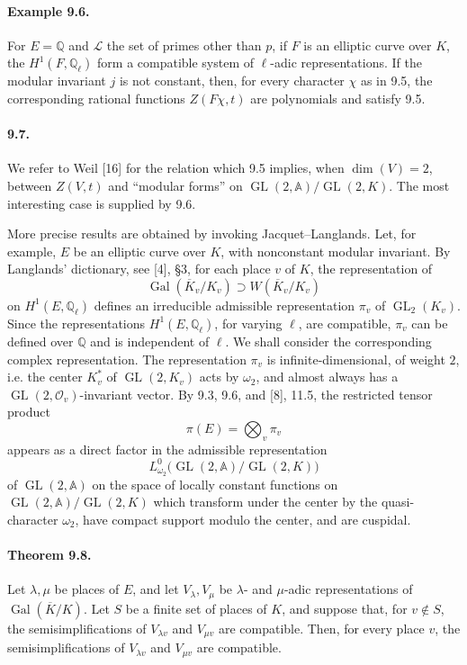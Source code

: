 \documentclass[10pt,letterpaper]{article}
\newcommand{\Q}{\mathbb Q}
\newcommand{\Gal}{\operatorname{Gal}}
\newcommand{\GL}{\operatorname{GL}}
\providecommand{\Gal}{\operatorname{Gal}}
\providecommand{\GL}{\operatorname{GL}}
\providecommand{\LLL}{\mathcal L}
\providecommand{\Gal}{\operatorname{Gal}}
\providecommand{\GL}{\operatorname{GL}}
\providecommand{\Gal}{\operatorname{Gal}}
\providecommand{\Gal}{\operatorname{Gal}}
\begin{document}
\paragraph{Example 9.6.} For $E=\Q$ and $\LLL$ the set of primes other than $p$, if $F$ is an elliptic curve over $K$, the $H^1(F,\Q_\ell)$ form a compatible system of $\ell$-adic representations. If the modular invariant $j$ is not constant, then, for every character $\chi$ as in 9.5, the corresponding rational functions $Z(F\chi,t)$ are polynomials and satisfy 9.5.

\paragraph{9.7.} We refer to Weil [16] for the relation which 9.5 implies, when $\dim(V)=2$, between $Z(V,t)$ and “modular forms” on $\GL(2,\mathbb A)/\GL(2,K)$. The most interesting case is supplied by 9.6.

More precise results are obtained by invoking Jacquet--Langlands. Let, for example, $E$ be an elliptic curve over $K$, with nonconstant modular invariant. By Langlands' dictionary, see [4], §3, for each place $v$ of $K$, the representation of
\[
\Gal(\overline K_v/K_v)\supset W(\overline K_v/K_v)
\]
on $H^1(E,\Q_\ell)$ defines an irreducible admissible representation $\pi_v$ of $\GL_2(K_v)$. Since the representations $H^1(E,\Q_\ell)$, for varying $\ell$, are compatible, $\pi_v$ can be defined over $\Q$ and is independent of $\ell$. We shall consider the corresponding complex representation. The representation $\pi_v$ is infinite-dimensional, of weight $2$, i.e. the center $K_v^*$ of $\GL(2,K_v)$ acts by $\omega_2$, and almost always has a $\GL(2,\mathcal O_v)$-invariant vector. By 9.3, 9.6, and [8], 11.5, the restricted tensor product
\[
\pi(E)=\bigotimes_v \pi_v
\]
appears as a direct factor in the admissible representation
\[
L^0_{\omega_2}\bigl(\GL(2,\mathbb A)/\GL(2,K)\bigr)
\]
of $\GL(2,\mathbb A)$ on the space of locally constant functions on $\GL(2,\mathbb A)/\GL(2,K)$ which transform under the center by the quasi-character $\omega_2$, have compact support modulo the center, and are cuspidal.

\paragraph{Theorem 9.8.} Let $\lambda,\mu$ be places of $E$, and let $V_\lambda,V_\mu$ be $\lambda$- and $\mu$-adic representations of $\Gal(\overline K/K)$. Let $S$ be a finite set of places of $K$, and suppose that, for $v\notin S$, the semisimplifications of $V_{\lambda v}$ and $V_{\mu v}$ are compatible. Then, for every place $v$, the semisimplifications of $V_{\lambda v}$ and $V_{\mu v}$ are compatible.
\end{document}
